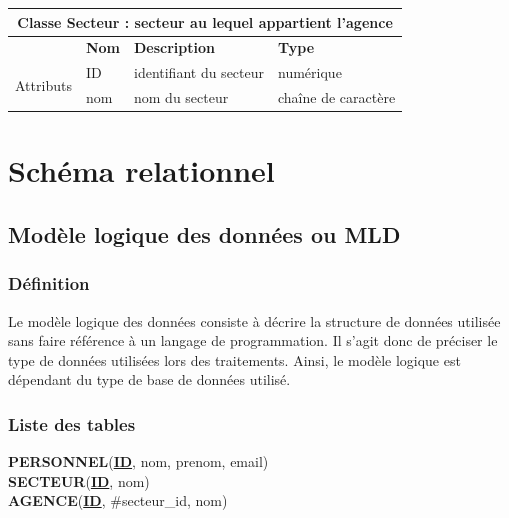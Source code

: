 		
		\begin{center}
			{\renewcommand{\arraystretch}{1.5}\begin{tabularx}{\textwidth}{|l|l|l|X|}
					\hline
					\multicolumn{4}{|c|}{\textbf{Classe Secteur : secteur au lequel appartient l'agence}} \\
					
					\hline
					
					& \textbf{Nom} & \textbf{Description} & \textbf{Type} \\
					\multirow{3}{*}{Attributs} & ID & identifiant du secteur & numérique \\
					
					& nom & nom du secteur &  chaîne de caractère \\
					
					\hline
			\end{tabularx}}
			\label{table11}
		\end{center}
		
		
		\section{Schéma relationnel}
			\subsection{Modèle logique des données ou MLD}
				\subsubsection{Définition}
					Le modèle logique des données consiste à décrire la structure de données utilisée sans faire référence à un langage de programmation. Il s'agit donc de préciser le type de données utilisées lors des traitements. Ainsi, le modèle logique est dépendant du type de base de données utilisé.
				\subsubsection{Liste des tables}
					
					\textbf{PERSONNEL}(\underline{\textbf{ID}}, nom, prenom, email)\\
					
					\textbf{SECTEUR}(\underline{\textbf{ID}}, nom)\\
					
					\textbf{AGENCE}(\underline{\textbf{ID}}, \#secteur\_id, nom)\\
					
